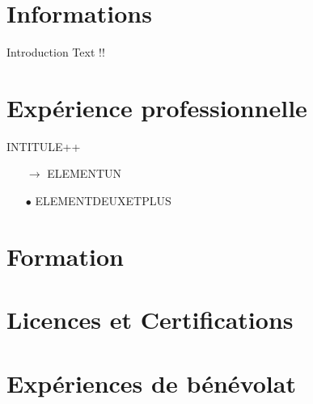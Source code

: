 \documentclass[11pt,a4paper]{moderncv}
\title{\titreGeneral }			%
\def\titreGeneral{Titre poste CV}
\def\titreSpecialite{( Spécialité )}
\def\prenom{ Prénom }
\def\nom{ Nom }
\def\prenomNom{\prenom ~\nom }
\def\logoGliderRight{../img/logo-glider-right.png}
\def\logoGliderLeftt{../img/logo-glider-left.png}
\def\logoCreativeCommon{../img/CreativeCommonLogo.jpeg}
\def\includeLogoCC{\texttt{[image: \\logoCreativeCommon ]}}
\def\makestylefancyContent{%
	\fancyhf{}
	\fancyhead[LE]{
		\texttt{[image: \\logoGliderLeftt ]}
		\hfill
		\prenomNom 
		\hfill
		\titreGeneral  -- \titreSpecialite
	}
	\fancyfoot[LE]{
		\texttt{[image: \\logoGliderLeftt ]} \hfill
		\includeLogoCC  \prenomNom  -- \today \hfill %
		\thepage /\pageref{LastPage}
	}
	
	\fancyhead[RO]{
		\titreGeneral  -- \titreSpecialite
		\hfill
		\prenomNom 
		\hfill
		\texttt{[image: \\logoGliderRight ]}
	}
	\fancyfoot[RO]{
		\thepage /\pageref{LastPage} \hfill
		\includeLogoCC  \prenomNom  -- \today \hfill %
		\texttt{[image: \\logoGliderRight ]}
	}
	\renewcommand{\headrulewidth}{0.25pt}
	\renewcommand{\footrulewidth}{0.5pt}
}%
\begin{document}
	\maketitle

\section{Informations}
	Introduction Text !!~\\

\section{Exp{\'e}rience professionnelle}

			{\newline INTITULE++}{%
		\begin{itemize}
			\item[$\rightarrow$] ELEMENTUN
			\item[$\bullet$] ELEMENTDEUXETPLUS
		\end{itemize}}

\section{Formation}
		{}{}{}

\section{Licences et Certifications}
		{}{}{}

\section{Expériences de bénévolat}
\end{document}
